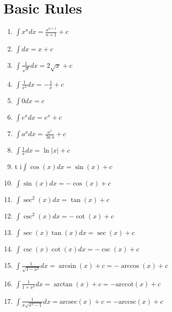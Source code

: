 \section{Basic Rules}
  \begin{enumerate}
    \item $\int x^n dx = \frac{x^{n+1}}{n+1} + c$
    \item $\int dx = x + c$
    \item $\int \frac{1}{\sqrt{x}} dx = 2\sqrt{x} + c$
    \item $\int \frac{1}{x^2} dx = -\frac{1}{x} + c$
    \item $\int 0 dx = c$
    \item $\int e^x dx = e^x + c$
    \item $\int a^x dx = \frac{a^x}{\ln a} + c$
    \item $\int \frac{1}{x} dx = \ln |x| + c$
    \item t i$\int \cos(x) dx = \sin(x) + c$
    \item $\int \sin(x) dx = -\cos(x) + c$
    \item $\int \sec^2(x) dx = \tan(x) + c$
    \item $\int \csc^2(x) dx = -\cot(x) + c$
    \item $\int \sec(x)\tan(x) dx = \sec(x) + c$
    \item $\int \csc(x)\cot(x) dx = -\csc(x) + c$
    \item $\int \frac{1}{\sqrt{1-x^2}} dx = \arcsin(x) + c = -\arccos(x) + c$
    \item $\int \frac{1}{1+x^2} dx = \arctan(x) + c = -\text{arccot}(x) + c$
    \item $\int \frac{1}{x\sqrt{x^2-1}} dx = \text{arcsec}(x) + c = -\text{arccsc}(x) + c$
  \end{enumerate}
